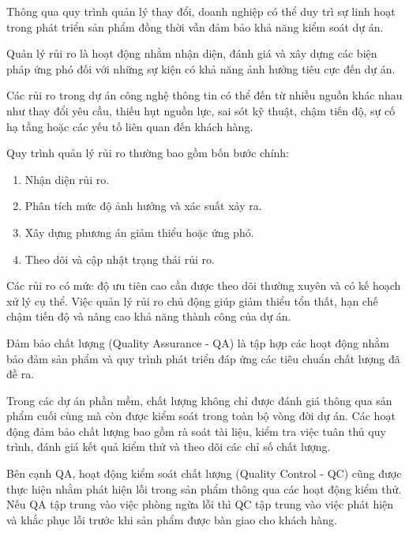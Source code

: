 \hspace{0.2cm}Thông qua quy trình quản lý thay đổi, doanh nghiệp có thể duy trì sự linh hoạt trong phát triển sản phẩm đồng thời vẫn đảm bảo khả năng kiểm soát dự án.



\hspace{0.2cm}Quản lý rủi ro là hoạt động nhằm nhận diện, đánh giá và xây dựng các biện pháp ứng phó đối với những sự kiện có khả năng ảnh hưởng tiêu cực đến dự án.

\hspace{0.2cm}Các rủi ro trong dự án công nghệ thông tin có thể đến từ nhiều nguồn khác nhau như thay đổi yêu cầu, thiếu hụt nguồn lực, sai sót kỹ thuật, chậm tiến độ, sự cố hạ tầng hoặc các yếu tố liên quan đến khách hàng.

\hspace{0.2cm}Quy trình quản lý rủi ro thường bao gồm bốn bước chính:

\begin{enumerate}
    \item Nhận diện rủi ro.
    \item Phân tích mức độ ảnh hưởng và xác suất xảy ra.
    \item Xây dựng phương án giảm thiểu hoặc ứng phó.
    \item Theo dõi và cập nhật trạng thái rủi ro.
\end{enumerate}

\hspace{0.2cm}Các rủi ro có mức độ ưu tiên cao cần được theo dõi thường xuyên và có kế hoạch xử lý cụ thể. Việc quản lý rủi ro chủ động giúp giảm thiểu tổn thất, hạn chế chậm tiến độ và nâng cao khả năng thành công của dự án.



\hspace{0.2cm}Đảm bảo chất lượng (Quality Assurance - QA) là tập hợp các hoạt động nhằm bảo đảm sản phẩm và quy trình phát triển đáp ứng các tiêu chuẩn chất lượng đã đề ra.

\hspace{0.2cm}Trong các dự án phần mềm, chất lượng không chỉ được đánh giá thông qua sản phẩm cuối cùng mà còn được kiểm soát trong toàn bộ vòng đời dự án. Các hoạt động đảm bảo chất lượng bao gồm rà soát tài liệu, kiểm tra việc tuân thủ quy trình, đánh giá kết quả kiểm thử và theo dõi các chỉ số chất lượng.

\hspace{0.2cm}Bên cạnh QA, hoạt động kiểm soát chất lượng (Quality Control - QC) cũng được thực hiện nhằm phát hiện lỗi trong sản phẩm thông qua các hoạt động kiểm thử. Nếu QA tập trung vào việc phòng ngừa lỗi thì QC tập trung vào việc phát hiện và khắc phục lỗi trước khi sản phẩm được bàn giao cho khách hàng.

